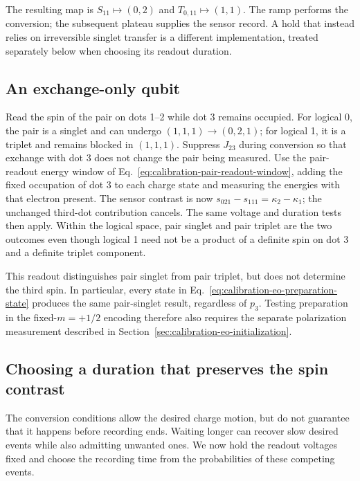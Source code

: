 The resulting map is $S_{11}\mapsto(0,2)$ and
$T_{0,11}\mapsto(1,1)$. The ramp performs the conversion; the
subsequent plateau supplies the sensor record. A hold that instead
relies on irreversible singlet transfer is a different implementation,
treated separately below when choosing its readout duration.

\subsection{An exchange-only qubit}
\label{sec:calibration-eo-readout}

Read the spin of the pair on dots 1--2 while dot 3 remains occupied.
For logical 0, the pair is a singlet and can undergo
$(1,1,1)\rightarrow(0,2,1)$; for logical 1, it is a triplet and
remains blocked in $(1,1,1)$. Suppress $J_{23}$ during conversion
so that exchange with dot 3 does not change the pair being measured.
Use the pair-readout energy window of
Eq.~\eqref{eq:calibration-pair-readout-window}, adding the fixed
occupation of dot 3 to each charge state and measuring the energies
with that electron present. The sensor contrast is now
$s_{021}-s_{111}=\kappa_2-\kappa_1$; the unchanged third-dot
contribution cancels. The same voltage and duration tests then
apply. Within the logical space, pair singlet and pair triplet
are the two outcomes even though logical 1 need not be a product
of a definite spin on dot 3 and a definite triplet component.

This readout distinguishes pair singlet from pair triplet, but
does not determine the third spin. In particular, every state
in Eq.~\eqref{eq:calibration-eo-preparation-state} produces the
same pair-singlet result, regardless of $p_3$. Testing preparation
in the fixed-$m=+1/2$ encoding therefore also requires the separate
polarization measurement described in
Section~\ref{sec:calibration-eo-initialization}.

\subsection{Choosing a duration that preserves the spin contrast}
\label{sec:calibration-readout-duration-choice}

The conversion conditions allow the desired charge motion, but do
not guarantee that it happens before recording ends. Waiting longer
can recover slow desired events while also admitting unwanted ones.
We now hold the readout voltages fixed and choose the recording
time from the probabilities of these competing events.

